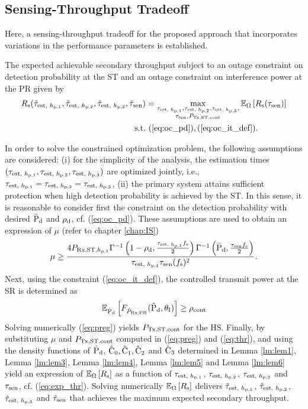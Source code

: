 \subsection{Sensing-Throughput Tradeoff}
Here, a sensing-throughput tradeoff for the proposed approach that incorporates variations in the performance parameters is established. 
\begin{theorem} \label{th:th1}
\normalfont
The expected achievable secondary throughput subject to an outage constraint on detection probability at the ST and an outage constraint on interference power at the PR given by
\begin{align}
R_{\text{s}}(\tilde{\tau}_{\text{est, $h_{\text{p,1}}$}}, \tilde{\tau}_{\text{est, $h_{\text{p,2}}$}}, \tilde{\tau}_{\text{est, $h_{\text{p,3}}$}}, \tilde{\tau}_{\text{sen}}) &= \operatorname*{max}_{\substack{\tau_{\text{est, $h_{\text{p,1}}$}}, \tau_{\text{est, $h_{\text{p,2}}$}}, \tau_{\text{est, $h_{\text{p,3}}$}}, \\ \tau_{\text{sen}}, P_{\text{Tx,ST,cont}}}} {\mathbb E}_{\Omega}\left[ R_{\text{s}}(\tau_{\text{sen}}) \right] \label{eq:opT_em}\\
\text{s.t.} & \text{ } (\ref{eq:oc_pd}), (\ref{eq:oc_it_def}). \nonumber 
\end{align}
\end{theorem}
\begin{IEEEproof}
In order to solve the constrained optimization problem, the following assumptions are considered: (i) for the simplicity of the analysis, the estimation times $(\tau_{\text{est, $h_{\text{p,1}}$}}, \tau_{\text{est, $h_{\text{p,2}}$}}, \tau_{\text{est, $h_{\text{p,3}}$}})$ are optimized jointly, i.e., $\tau_{\text{est, $h_{\text{p,1}}$}} = \tau_{\text{est, $h_{\text{p,2}}$}} = \tau_{\text{est, $h_{\text{p,3}}$}}$, (ii) the primary system attains sufficient protection when high detection probability is achieved by the ST. In this sense, it is reasonable to consider first the constraint on the detection probability with desired $\bar{\text{P}}_{\text{d}}$ and $\rho_{\text{d}}$, cf. (\ref{eq:oc_pd}). These assumptions are used to obtain an expression of $\mu$ (refer to chapter \ref{chap:IS}) 
\begin{align}
\mu \ge \frac{4 P_{\text{Rx,ST,$h_{\text{p,1}}$}} \Gamma^{-1} \left(1 - \rho_{\text{d}}, \frac{\tau_{\text{est, $h_{\text{p,1}}$}} f_{\text{s}}}{2}\right) \Gamma^{-1} \left(\bar{\text{P}}_{\text{d}}, \frac{\tau_{\text{sen}} f_{\text{s}}}{2}\right)}{ \tau_{\text{est, $h_{\text{p,1}}$}} \tau_{\text{sen}} (f_{\text{s}})^2  }. 
\label{eq:thr}
\end{align}
Next, using the constraint (\ref{eq:oc_it_def}), the controlled transmit power at the SR is determined as  
\begin{align}
\e{\epd}{\fprcvdpr(\epd, \ite)} \ge \opc %
\label{eq:preg}
\end{align}
Solving numerically (\ref{eq:preg}) yields $P_{\text{Tx,ST,cont}}$ for the HS.
Finally, by substituting $\mu$ and $P_{\text{Tx,ST,cont}}$ computed in (\ref{eq:preg}) and (\ref{eq:thr}), and using the density functions of $\hat{\text{P}}_{\text{d}}$, $\hat{\text{C}}_{\text{0}}, \hat{\text{C}}_{\text{1}}, \hat{\text{C}}_{\text{2}}$ and $\hat{\text{C}}_{\text{3}}$ determined in Lemma \ref{lm:lem1}, Lemma \ref{lm:lem3}, Lemma \ref{lm:lem4}, Lemma \ref{lm:lem5} and Lemma \ref{lm:lem6} yield an expression of ${\mathbb E}_{\Omega}\left[ R_{\text{s}} \right]$ as a function of $\tau_{\text{est, $h_{\text{p,1}}$}}$, $\tau_{\text{est, $h_{\text{p,2}}$}}$, $\tau_{\text{est, $h_{\text{p,3}}$}}$ and $\tau_{\text{sen}}$, cf. (\ref{eq:exp_thr}). Solving numerically ${\mathbb E}_{\Omega}\left[ R_{\text{s}} \right]$ delivers $\tilde{\tau}_{\text{est, $h_{\text{p,1}}$}}$, $\tilde{\tau}_{\text{est, $h_{\text{p,2}}$}}$, $\tilde{\tau}_{\text{est, $h_{\text{p,3}}$}}$ and $\tilde{\tau}_{\text{sen}}$ that achieves the maximum expected secondary throughput.  
\end{IEEEproof}
